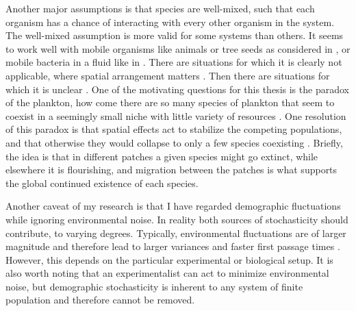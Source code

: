 Another major assumptions is that species are well-mixed, such that each organism has a chance of interacting with every other organism in the system. 
The well-mixed assumption is more valid for some systems than others. 
It seems to work well with mobile organisms like animals or tree seeds as considered in \cite{Hubbell2001}, or mobile bacteria in a fluid like in \cite{Gore2009,Frey2010,Posfai2017,Abreu2019}. %
There are situations for which it is clearly not applicable, where spatial arrangement matters \cite{Durrett1994,Tilman1997,Haydon2001,Houchmandzadeh2002,Korolev2011}. 
Then there are situations for which it is unclear \cite{MacArthur1970,Peterson1997,Chesson2000,Kessler2015}. 
One of the motivating questions for this thesis is the paradox of the plankton, how come there are so many species of plankton that seem to coexist in a seemingly small niche with little variety of resources \cite{Hutchinson1961}. 
One resolution of this paradox is that spatial effects act to stabilize the competing populations, and that otherwise they would collapse to only a few species coexisting \cite{Roy2007}. 
Briefly, the idea is that in different patches a given species might go extinct, while elsewhere it is flourishing, and migration between the patches is what supports the global continued existence of each species. 

Another caveat of my research is that I have regarded demographic fluctuations while ignoring environmental noise. 
In reality both sources of stochasticity should contribute, to varying degrees. 
Typically, environmental fluctuations are of larger magnitude and therefore lead to larger variances and faster first passage times \cite{Ovaskainen2010}. 
However, this depends on the particular experimental or biological setup. 
It is also worth noting that an experimentalist can act to minimize environmental noise, but demographic stochasticity is inherent to any system of finite population and therefore cannot be removed. 


